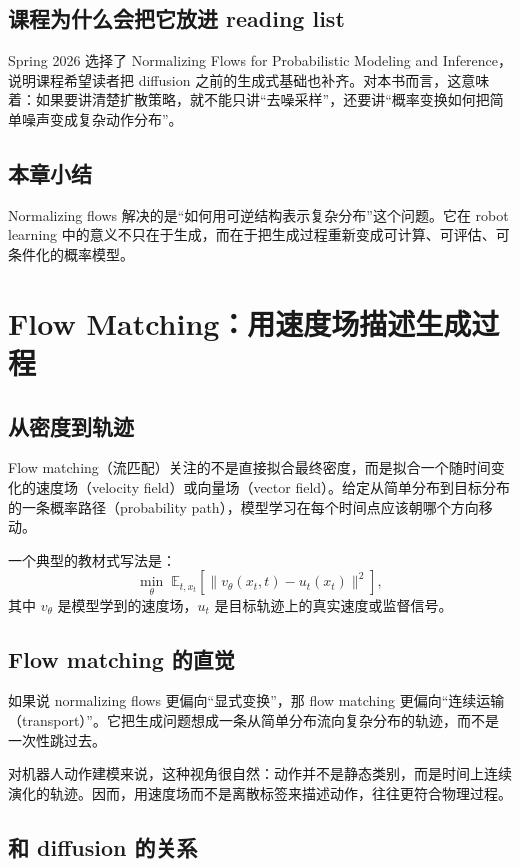 \documentclass[a4paper]{article}
\begin{document}
\subsection{课程为什么会把它放进 reading list}

Spring 2026 选择了 Normalizing Flows for Probabilistic Modeling and Inference，说明课程希望读者把 diffusion 之前的生成式基础也补齐。对本书而言，这意味着：如果要讲清楚扩散策略，就不能只讲“去噪采样”，还要讲“概率变换如何把简单噪声变成复杂动作分布”。

\subsection{本章小结}

Normalizing flows 解决的是“如何用可逆结构表示复杂分布”这个问题。它在 robot learning 中的意义不只在于生成，而在于把生成过程重新变成可计算、可评估、可条件化的概率模型。

\section{Flow Matching：用速度场描述生成过程}

\subsection{从密度到轨迹}

Flow matching（流匹配）关注的不是直接拟合最终密度，而是拟合一个随时间变化的速度场（velocity field）或向量场（vector field）。给定从简单分布到目标分布的一条概率路径（probability path），模型学习在每个时间点应该朝哪个方向移动。

一个典型的教材式写法是：
\[
\min_\theta \; \mathbb{E}_{t, x_t} \left[\|v_\theta(x_t, t) - u_t(x_t)\|^2\right],
\]
其中 \(v_\theta\) 是模型学到的速度场，\(u_t\) 是目标轨迹上的真实速度或监督信号。

\subsection{Flow matching 的直觉}

如果说 normalizing flows 更偏向“显式变换”，那 flow matching 更偏向“连续运输（transport）”。它把生成问题想成一条从简单分布流向复杂分布的轨迹，而不是一次性跳过去。

对机器人动作建模来说，这种视角很自然：动作并不是静态类别，而是时间上连续演化的轨迹。因而，用速度场而不是离散标签来描述动作，往往更符合物理过程。

\subsection{和 diffusion 的关系}
\end{document}
